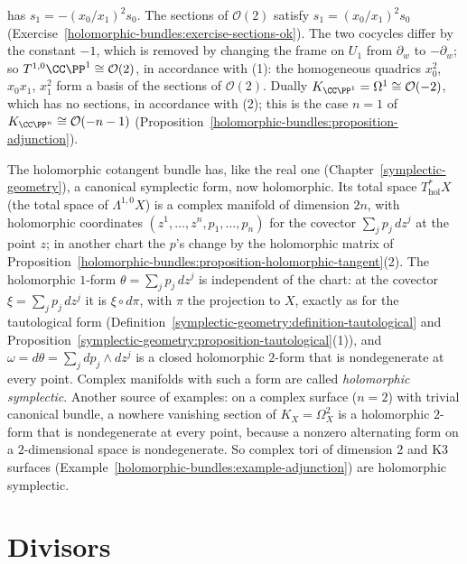 \begin{example}
\begin{enumerate}
has $s_1 = -(x_0/x_1)^2s_0$. The sections of $\mathcal{O}(2)$ satisfy $s_1 = (x_0/x_1)^2s_0$ (Exercise~\ref{holomorphic-bundles:exercise-sections-ok}). The two cocycles differ by the constant $-1$, which is
removed by changing the frame on $U_1$ from $\partial_w$ to $-\partial_w$; so $T^{1,0}\CC\PP^1 \cong \mathcal{O}(2)$, in accordance with (1): the homogeneous quadrics $x_0^2$, $x_0x_1$, $x_1^2$ form a basis of
the sections of $\mathcal{O}(2)$. Dually $K_{\CC\PP^1} = \Omega^1 \cong \mathcal{O}(-2)$, which has no sections, in accordance with (2); this is the case $n = 1$ of $K_{\CC\PP^n} \cong \mathcal{O}(-n-1)$
(Proposition~\ref{holomorphic-bundles:proposition-adjunction}).
\end{enumerate}
\end{example}

\begin{remark}\label{holomorphic-bundles:remark-holomorphic-symplectic}
The holomorphic cotangent bundle has, like the real one (Chapter~\ref{symplectic-geometry}), a canonical symplectic form, now holomorphic. Its total space $T^*_{\mathrm{hol}}X$ (the total space of $\Lambda^{1,0}X$) is a complex
manifold of dimension $2n$, with holomorphic coordinates $(z^1, \ldots, z^n, p_1, \ldots, p_n)$ for the covector $\sum_jp_j\,dz^j$ at the point $z$; in another chart the $p$'s change by the holomorphic matrix of
Proposition~\ref{holomorphic-bundles:proposition-holomorphic-tangent}(2). The holomorphic $1$-form $\theta = \sum_jp_j\,dz^j$ is independent of the chart: at the covector $\xi = \sum_jp_j\,dz^j$ it is $\xi \circ d\pi$, with $\pi$ the
projection to $X$, exactly as for the tautological form (Definition~\ref{symplectic-geometry:definition-tautological} and Proposition~\ref{symplectic-geometry:proposition-tautological}(1)), and $\omega = d\theta = \sum_jdp_j \wedge dz^j$ is a closed holomorphic $2$-form that is nondegenerate at every point. Complex manifolds with such a form are
called \emph{holomorphic symplectic}. Another source of examples: on a complex surface ($n = 2$) with trivial canonical bundle, a nowhere vanishing section of $K_X = \Omega^2_X$ is a holomorphic $2$-form that is
nondegenerate at every point, because a nonzero alternating form on a $2$-dimensional space is nondegenerate. So complex tori of dimension $2$ and K3 surfaces (Example~\ref{holomorphic-bundles:example-adjunction}) are
holomorphic symplectic.
\end{remark}

\section{Divisors}\label{holomorphic-bundles:section-divisors}

